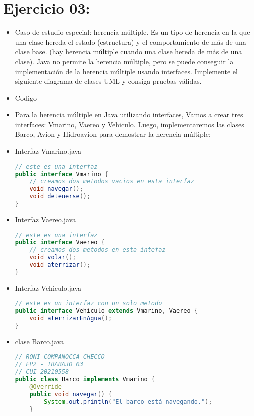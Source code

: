 \documentclass{article}
\begin{document}
    \section{Ejercicio 03:}
	\begin{itemize}
        \item Caso de estudio especial: herencia múltiple. Es un tipo de herencia en la que una clase hereda el estado (estructura) y el comportamiento de más de una clase base. (hay herencia múltiple cuando una clase hereda de más de una clase). Java no permite la herencia múltiple, pero se puede conseguir la implementación de la herencia múltiple usando interfaces. Implemente el siguiente diagrama de clases UML y consiga pruebas válidas.
        \item Codigo
        \item Para la herencia múltiple en Java utilizando interfaces, Vamos a crear tres interfaces: Vmarino, Vaereo y Vehiculo. Luego, implementaremos las clases Barco, Avion y Hidroavion para demostrar la herencia múltiple:
        \item Interfaz Vmarino.java
        \begin{lstlisting}[language=java]
// este es una interfaz
public interface Vmarino {
    // creamos dos metodos vacios en esta interfaz
    void navegar();
    void detenerse();
}
        \end{lstlisting}

        \item Interfaz Vaereo.java
        \begin{lstlisting}[language=java]
// este es una interfaz
public interface Vaereo {
    // creamos dos metodos en esta intefaz
    void volar();
    void aterrizar();
}
        \end{lstlisting}

        \item Interfaz Vehiculo.java
        \begin{lstlisting}[language=java]
// este es un interfaz con un solo metodo
public interface Vehiculo extends Vmarino, Vaereo {
    void aterrizarEnAgua();
}
        \end{lstlisting}

        \item clase Barco.java
        \begin{lstlisting}[language=java]
// RONI COMPANOCCA CHECCO
// FP2 - TRABAJO 03
// CUI 20210558
public class Barco implements Vmarino {
    @Override
    public void navegar() {
        System.out.println("El barco está navegando.");
    }


\end{lstlisting}
\end{itemize}
\end{document}
